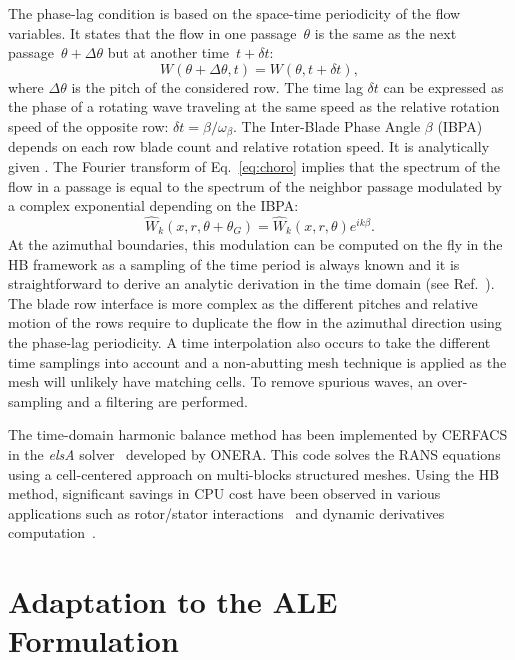 The phase-lag condition is based on the space-time periodicity of the
flow variables. It states that the flow in one passage~$\theta$ is the
same as the next passage~$\theta+\Delta\theta$ but at another
time~$t+\delta t$:
\begin{equation}
  W\left(\theta+\Delta\theta,t \right) = W\left(\theta,t+\delta t \right),
  \label{eq:choro}
\end{equation}
where $\Delta \theta$ is the pitch of the considered row.  The time
lag $\delta t$ can be expressed as the phase of a rotating wave
traveling at the same speed as the relative rotation speed of the
opposite row: $\delta t=\beta/\omega_\beta$.  The Inter-Blade Phase
Angle $\beta$ (IBPA) depends on each row blade count and relative
rotation speed. It is analytically given \citet{Gerolymos1991}.  The Fourier
transform of Eq.~\eqref{eq:choro} implies that the spectrum of the
flow in a passage is equal to the spectrum of the neighbor passage
modulated by a complex exponential depending on the IBPA:
\begin{equation*}
  \widehat{W}_k(x, r,  \theta+\theta_G)  = {\widehat{W}_k(x, r,
    \theta)e^{i k\beta}}.
\end{equation*}
At the azimuthal boundaries, this modulation can be computed on the fly
in the HB framework as a sampling of the time period is always known
and it is straightforward to derive an analytic derivation in the time
domain (see Ref.~\cite{JSicot2012}). The blade row interface is more complex
as the different pitches and relative motion of the rows require to
duplicate the flow in the azimuthal direction using the phase-lag
periodicity. A time interpolation also occurs to take the
different time samplings into account and a non-abutting mesh
technique is applied as the mesh will unlikely have matching
cells. To remove spurious waves, an over-sampling and a filtering are
performed. 

The time-domain harmonic balance method has been implemented 
by CERFACS in the
\emph{elsA} solver~\cite{Cambier2013} developed by ONERA. 
This code solves the RANS equations using a cell-centered
approach on multi-blocks structured meshes.  Using the HB method,
significant savings in CPU cost have been observed in various
applications such as rotor/stator interactions~\cite{JSicot2012}
and dynamic derivatives computation~\cite{CIHassan2011}. 


\section{Adaptation to the ALE Formulation}

